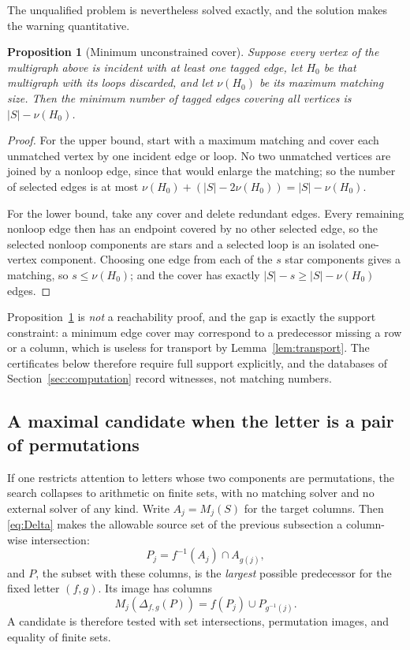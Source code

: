 \documentclass[11pt,letterpaper]{article}
\numberwithin{equation}{section}
\newtheorem{proposition}[theorem]{Proposition}
\theoremstyle{definition}
\theoremstyle{remark}
\begin{document}
The unqualified problem is nevertheless solved exactly, and the solution
makes the warning quantitative.

\begin{proposition}[Minimum unconstrained cover]\label{prop:matching}
Suppose every vertex of the multigraph above is incident with at least one
tagged edge, let $H_0$ be that multigraph with its loops discarded, and let
$\nu(H_0)$ be its maximum matching size. Then the minimum number of tagged
edges covering all vertices is $|S|-\nu(H_0)$.
\end{proposition}
\begin{proof}
For the upper bound, start with a maximum matching and cover each unmatched
vertex by one incident edge or loop. No two unmatched vertices are joined by
a nonloop edge, since that would enlarge the matching; so the number of
selected edges is at most $\nu(H_0)+(|S|-2\nu(H_0))=|S|-\nu(H_0)$.

For the lower bound, take any cover and delete redundant edges. Every
remaining nonloop edge then has an endpoint covered by no other selected
edge, so the selected nonloop components are stars and a selected loop is an
isolated one-vertex component. Choosing one edge from each of the $s$ star
components gives a matching, so $s\le\nu(H_0)$; and the cover has exactly
$|S|-s\ge|S|-\nu(H_0)$ edges.
\end{proof}

Proposition~\ref{prop:matching} is \emph{not} a reachability proof, and the
gap is exactly the support constraint: a minimum edge cover may correspond to
a predecessor missing a row or a column, which is useless for transport by
Lemma~\ref{lem:transport}. The certificates below therefore require full
support explicitly, and the databases of Section~\ref{sec:computation} record
witnesses, not matching numbers.

\subsection{A maximal candidate when the letter is a pair of permutations}
\label{sec:maximal-candidate}
If one restricts attention to letters whose two components are permutations,
the search collapses to arithmetic on finite sets, with no matching solver
and no external solver of any kind. Write $A_j=M_j(S)$ for the target columns.
Then \eqref{eq:Delta} makes the allowable source set of the previous
subsection a column-wise intersection:
\begin{equation}\label{eq:maxpre}
 P_j=f^{-1}(A_j)\cap A_{g(j)},
\end{equation}
and $P$, the subset with these columns, is the \emph{largest} possible
predecessor for the fixed letter $(f,g)$. Its image has columns
\begin{equation}\label{eq:column-image}
 M_j(\Delta_{f,g}(P))=f(P_j)\cup P_{g^{-1}(j)}.
\end{equation}
A candidate is therefore tested with set intersections, permutation images,
and equality of finite sets.
\end{document}

